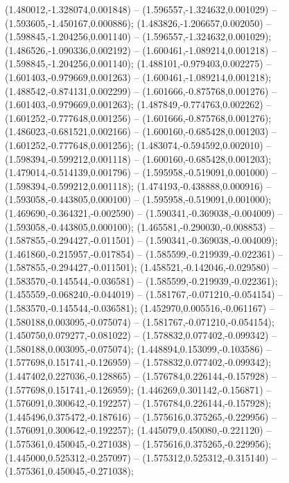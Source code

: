  (1.480012,-1.328074,0.001848) -- (1.596557,-1.324632,0.001029) -- (1.593605,-1.450167,0.000886);
 (1.483826,-1.206657,0.002050) -- (1.598845,-1.204256,0.001140) -- (1.596557,-1.324632,0.001029);
 (1.486526,-1.090336,0.002192) -- (1.600461,-1.089214,0.001218) -- (1.598845,-1.204256,0.001140);
 (1.488101,-0.979403,0.002275) -- (1.601403,-0.979669,0.001263) -- (1.600461,-1.089214,0.001218);
 (1.488542,-0.874131,0.002299) -- (1.601666,-0.875768,0.001276) -- (1.601403,-0.979669,0.001263);
 (1.487849,-0.774763,0.002262) -- (1.601252,-0.777648,0.001256) -- (1.601666,-0.875768,0.001276);
 (1.486023,-0.681521,0.002166) -- (1.600160,-0.685428,0.001203) -- (1.601252,-0.777648,0.001256);
 (1.483074,-0.594592,0.002010) -- (1.598394,-0.599212,0.001118) -- (1.600160,-0.685428,0.001203);
 (1.479014,-0.514139,0.001796) -- (1.595958,-0.519091,0.001000) -- (1.598394,-0.599212,0.001118);
 (1.474193,-0.438888,0.000916) -- (1.593058,-0.443805,0.000100) -- (1.595958,-0.519091,0.001000);
 (1.469690,-0.364321,-0.002590) -- (1.590341,-0.369038,-0.004009) -- (1.593058,-0.443805,0.000100);
 (1.465581,-0.290030,-0.008853) -- (1.587855,-0.294427,-0.011501) -- (1.590341,-0.369038,-0.004009);
 (1.461860,-0.215957,-0.017854) -- (1.585599,-0.219939,-0.022361) -- (1.587855,-0.294427,-0.011501);
 (1.458521,-0.142046,-0.029580) -- (1.583570,-0.145544,-0.036581) -- (1.585599,-0.219939,-0.022361);
 (1.455559,-0.068240,-0.044019) -- (1.581767,-0.071210,-0.054154) -- (1.583570,-0.145544,-0.036581);
 (1.452970,0.005516,-0.061167) -- (1.580188,0.003095,-0.075074) -- (1.581767,-0.071210,-0.054154);
 (1.450750,0.079277,-0.081022) -- (1.578832,0.077402,-0.099342) -- (1.580188,0.003095,-0.075074);
 (1.448894,0.153099,-0.103586) -- (1.577698,0.151741,-0.126959) -- (1.578832,0.077402,-0.099342);
 (1.447402,0.227036,-0.128865) -- (1.576784,0.226144,-0.157928) -- (1.577698,0.151741,-0.126959);
 (1.446269,0.301142,-0.156871) -- (1.576091,0.300642,-0.192257) -- (1.576784,0.226144,-0.157928);
 (1.445496,0.375472,-0.187616) -- (1.575616,0.375265,-0.229956) -- (1.576091,0.300642,-0.192257);
 (1.445079,0.450080,-0.221120) -- (1.575361,0.450045,-0.271038) -- (1.575616,0.375265,-0.229956);
 (1.445000,0.525312,-0.257097) -- (1.575312,0.525312,-0.315140) -- (1.575361,0.450045,-0.271038);
